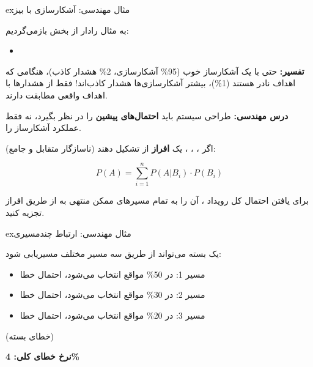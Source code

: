 \begin{PSbox}[unbreakable]{ex}{مثال مهندسی: آشکارسازی با بیز}

به مثال رادار از بخش  بازمی‌گردیم:

\begin{itemize}
\tightlist
\item
\end{itemize}



\textbf{تفسیر:} حتی با یک آشکارساز خوب (95\% آشکارسازی، 2\% هشدار کاذب)، هنگامی که اهداف نادر هستند (1\%)، بیشتر آشکارسازی‌ها هشدار کاذب‌اند! فقط  از هشدارها با اهداف واقعی مطابقت دارند.

\textbf{درس مهندسی:} طراحی سیستم باید \textbf{احتمال‌های پیشین} را در نظر بگیرد، نه فقط عملکرد آشکارساز را.

\end{PSbox}



اگر ، ، ،  یک \textbf{افراز} از  تشکیل دهند (ناسازگار متقابل و جامع):

\[P(A) = \sum_{i=1}^{n} P(A|B_i) \cdot P(B_i)\]


برای یافتن احتمال کل رویداد ، آن را به تمام مسیرهای ممکن منتهی به  از طریق افراز تجزیه کنید.

\begin{PSbox}[unbreakable]{ex}{مثال مهندسی: ارتباط چندمسیری}

یک بسته می‌تواند از طریق سه مسیر مختلف مسیریابی شود:

\begin{itemize}
\tightlist
\item
  مسیر 1: در 50\% مواقع انتخاب می‌شود، احتمال خطا 
\item
  مسیر 2: در 30\% مواقع انتخاب می‌شود، احتمال خطا 
\item
  مسیر 3: در 20\% مواقع انتخاب می‌شود، احتمال خطا 
\end{itemize}

(خطای بسته) \PSbr{}\PSbr{}

\textbf{نرخ خطای کلی: 4\%}

\end{PSbox}

